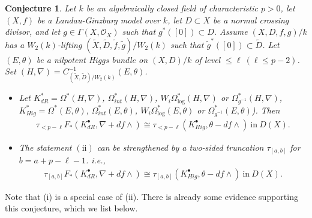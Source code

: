 \documentclass[12pt, a4paper]{article}
\newtheorem{conjecture}{Conjecture}[section]
\begin{document}
\begin{conjecture}\label{conjecture}
Let $k$ be an algebraically closed field of characteristic $p>0$, let $(X,f)$ be a Landau-Ginzburg model over $k$, let $D\subset X$ be a normal crossing divisor, and let $g\in\Gamma(X,\mathcal O_X)$ such that $g^*([0])\subset D$. Assume $(X,D,f,g)/k$ has a $W_2(k)$-lifting $(\tilde X,\tilde D,\tilde f,\tilde g)/W_2(k)$ such that $\tilde g^*([0])\subset\tilde D$. Let $(E,\theta)$ be a nilpotent Higgs bundle on $(X,D)/k$ of level $\leq\ell~(\ell\leq p-2)$. Set $(H,\nabla)=C^{-1}_{(\tilde X,\tilde D)/W_2(k)}(E,\theta)$.
\begin{itemize}

\item[$\mathrm{(C1)}$] Let $K^*_{dR}=\Omega^*(H,\nabla)$, $\Omega_{int}^*(H,\nabla)$, $W_i\Omega^*_{\log}(H,\nabla)$ or $\Omega^*_{g^{-1}}(H,\nabla)$, $K^*_{Hig}=\Omega^*(E,\theta)$, $\Omega_{int}^*(E,\theta)$, $W_i\Omega^*_{\log}(E,\theta)$ or $\Omega^*_{g^{-1}}(E,\theta)$). Then
\begin{eqnarray}\label{Con2}
\tau_{<p-\ell}F_*(K^\bullet_{dR},\nabla+df\wedge)\cong \tau_{<p-\ell}(K^\bullet_{Hig},\theta-df\wedge)~\mathrm{in}~D(X).
\end{eqnarray}
 \item[$\mathrm{(C2)}$] The statement $\mathrm{(ii)}$ can be strengthened by a two-sided truncation $\tau_{[a,b]}$ for $b=a+p-\ell-1$. i.e., 
\begin{eqnarray}\label{Con3}
\tau_{[a,b]}F_*(K^\bullet_{dR},\nabla+df\wedge)\cong \tau_{[a,b]}(K^\bullet_{Hig},\theta-df\wedge)~\mathrm{in}~D(X).
\end{eqnarray}
\end{itemize}
\end{conjecture}
Note that (i) is a special case of (ii). There is already some evidence supporting this conjecture, which we list below.
\end{document}
